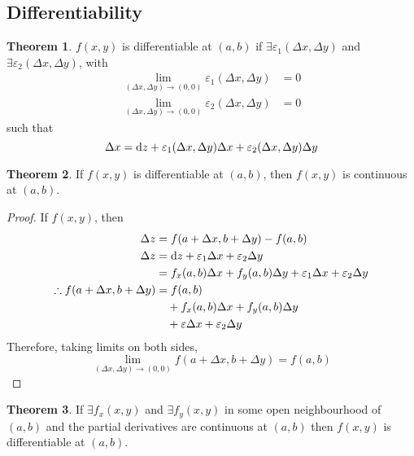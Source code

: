 \documentclass[fleqn, a4paper, 12pt]{article}
\theoremstyle{definition}
\theoremstyle{theorem}
\newtheorem{theorem}{Theorem}
\theoremstyle{remark}
\begin{document}
\subsection{Differentiability}

\begin{theorem}
	$f(x, y)$ is differentiable at $(a, b)$ if $\exists \varepsilon_1(\Delta x, \Delta y)$ and $\exists \varepsilon_2(\Delta x, \Delta y)$, with
	\begin{align*}
		\lim\limits_{(\Delta x, \Delta y) \to (0, 0)} \varepsilon_1(\Delta x, \Delta y) &= 0\\
		\lim\limits_{(\Delta x, \Delta y) \to (0, 0)} \varepsilon_2(\Delta x, \Delta y) &= 0
	\end{align*}
	such that
	\begin{equation*}
		\Delta x = \dif z + \varepsilon_1(\Delta x, \Delta y) \Delta x + \varepsilon_2 (\Delta x, \Delta y) \Delta y
	\end{equation*}
\end{theorem}

\begin{theorem}
	If $f(x, y)$ is differentiable at $(a, b)$, then $f(x, y)$ is continuous at $(a, b)$. 
\end{theorem}

\begin{proof}
	If $f(x, y)$, then
	\begin{align*}
		\Delta z &= f(a + \Delta x, b + \Delta y) - f(a, b)\\
		\Delta z &= \dif z + \varepsilon_1 \Delta x + \varepsilon_2 \Delta y\\
		&= f_x(a, b) \Delta x + f_y(a, b) \Delta y + \varepsilon_1 \Delta x + \varepsilon_2 \Delta y\\
		\therefore f(a + \Delta x, b + \Delta y) &= f(a, b) \\
		&\quad+ f_x(a, b) \Delta x + f_y(a, b) \Delta y \\
		&\quad+ \varepsilon \Delta x + \varepsilon_2 \Delta y\\
	\end{align*}
	Therefore, taking limits on both sides,
	\begin{equation*}
		\lim\limits_{(\Delta x, \Delta y) \to (0, 0)} f(a + \Delta x, b + \Delta y) = f(a, b)
	\end{equation*}
\end{proof}

\begin{theorem}
	If $\exists f_x(x, y)$ and $\exists f_y(x, y)$ in some open neighbourhood of $(a, b)$ and the partial derivatives are continuous at $(a, b)$ then $f(x, y)$ is differentiable at $(a, b)$.
\end{theorem}
\end{document}
